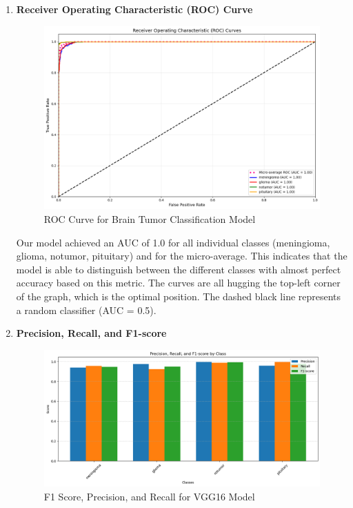 \begin{enumerate}[label=\roman*.]

\item \textbf{Receiver Operating Characteristic (ROC) Curve}

\begin{figure}[H]
    \centering
    \includegraphics[width=0.9\linewidth]{Images/Metrices/roc.png}
    \caption{ROC Curve for Brain Tumor Classification Model}
    \label{fig:VGG16 ROC Curve}
\end{figure}

Our model achieved an AUC of 1.0 for all individual classes (meningioma,
glioma, notumor, pituitary) and for the micro-average. This indicates that the
model is able to distinguish between the different classes with almost perfect
accuracy based on this metric. The curves are all hugging the top-left corner
of the graph, which is the optimal position. The dashed black line represents a
random classifier (AUC = 0.5).

\item \textbf{Precision, Recall, and F1-score}
\begin{figure}[H]
    \centering
    \includegraphics[width=1\linewidth]{Images/Metrices/scores.png}
    \caption{F1 Score, Precision, and Recall for VGG16 Model}
    \label{fig:VGG16 Scores}
\end{figure}


\end{enumerate}
